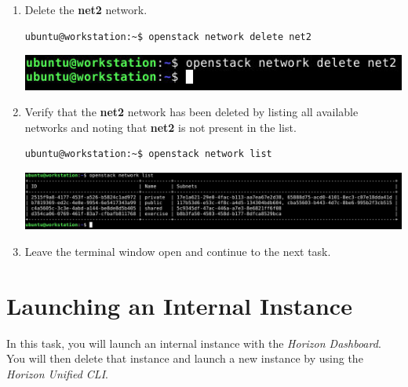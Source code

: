 \documentclass[letterpaper, 12pt]{article}
\begin{document}
\begin{enumerate}
    \item Delete the \textbf{net2} network.
\begin{lstlisting}
ubuntu@workstation:~$ openstack network delete net2
\end{lstlisting}

    \begin{center}
        \includegraphics[width=\linewidth]{images/part3/step13.png}
    \end{center}

    \item Verify that the \textbf{net2} network has been deleted by listing all available networks and noting that
    \textbf{net2} is not present in the list.
\begin{lstlisting}
ubuntu@workstation:~$ openstack network list
\end{lstlisting}

    \begin{center}
        \includegraphics[width=\linewidth]{images/part3/step14.png}
    \end{center}

    \item Leave the terminal window open and continue to the next task.

\end{enumerate}

\section{Launching an Internal Instance}
\label{sec:launching_an_internal_instance}
In this task, you will launch an internal instance with the \textit{Horizon Dashboard}. You will then delete that
instance and launch a new instance by using the \textit{Horizon Unified CLI}.
\end{document}
